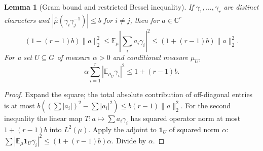 \documentclass[11pt]{article}
\newtheorem{lemma}[theorem]{Lemma}
\theoremstyle{definition}\newtheorem{remark}[theorem]{Remark}
\newcommand{\C}{\mathbb C}
\newcommand{\E}{\mathbb E}
\newcommand{\ind}{\mathbf 1}
\newcommand{\norm}[1]{\lVert #1\rVert}
\begin{document}
\begin{lemma}[Gram bound and restricted Bessel inequality]\label{lem:gram}
If $\gamma_1,\dots,\gamma_r$ are distinct characters and $|\widehat\mu(\gamma_i\gamma_j^{-1})|\le b$ for $i\ne j$, then for $a\in\C^r$
\begin{equation}\label{eq:gram}
 (1-(r-1)b)\norm a_2^2\le\E_\mu|\sum_i a_i\gamma_i|^2
 \le(1+(r-1)b)\norm a_2^2.
\end{equation}
For a set $U\subseteq G$ of measure $\alpha>0$ and conditional measure $\mu_U$,
\begin{equation}\label{eq:bessel}
 \alpha\sum_{i=1}^r|\E_{\mu_U}\gamma_i|^2\le1+(r-1)b.
\end{equation}
\end{lemma}
\begin{proof}
Expand the square; the total absolute contribution of off-diagonal entries is at most $b((\sum |a_i|)^2-\sum |a_i|^2)\le b(r-1)\norm a_2^2$. For the second inequality the linear map $T:a\mapsto\sum a_i\gamma_i$ has squared operator norm at most $1+(r-1)b$ into $L^2(\mu)$. Apply the adjoint to $\ind_U$ of squared norm $\alpha$: $\sum |\E_\mu \ind_U\overline{\gamma_i}|^2\le(1+(r-1)b)\alpha$. Divide by $\alpha$.
\end{proof}
\end{document}
